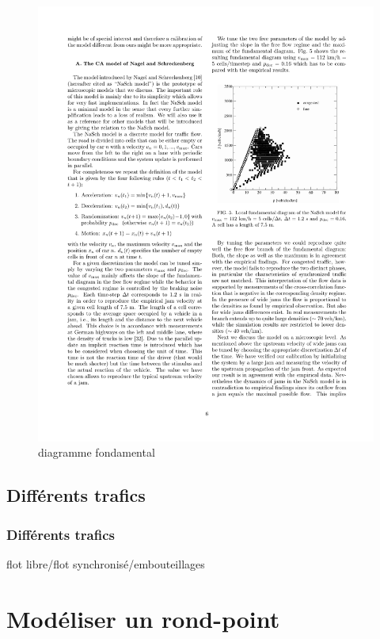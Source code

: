 \documentclass[slidetop,11pt]{beamer}
\begin{document}
\begin{frame}
	\begin{figure}
	\begin{center}
	\includegraphics[scale = 0.7]{./images/diagramme-fondamental}
	\end{center}
	\caption{diagramme fondamental}
	\end{figure}

\end{frame}

	\subsection{Différents trafics}
\begin{frame}
	\frametitle{Différents trafics}
	flot libre/flot synchronisé/embouteillages
\end{frame}

\section{Modéliser un rond-point}
\end{document}
